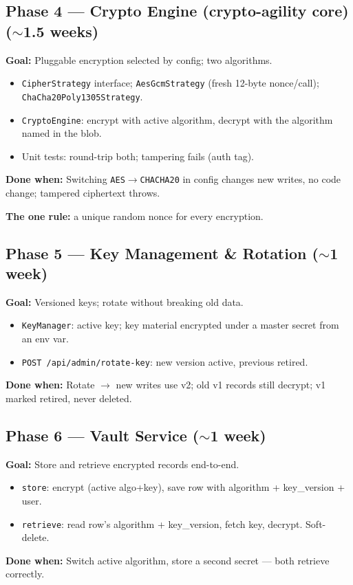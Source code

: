 \documentclass[11pt,a4paper]{article}
\newcommand{\code}[1]{\texttt{#1}}
\begin{document}
\subsection{Phase 4 — Crypto Engine (crypto-agility core) ($\sim$1.5 weeks)}
\textbf{Goal:} Pluggable encryption selected by config; two algorithms.
\begin{itemize}[leftmargin=*]
  \item \code{CipherStrategy} interface; \code{AesGcmStrategy} (fresh 12-byte nonce/call); \code{ChaCha20Poly1305Strategy}.
  \item \code{CryptoEngine}: encrypt with active algorithm, decrypt with the algorithm named in the blob.
  \item Unit tests: round-trip both; tampering fails (auth tag).
\end{itemize}
\textbf{Done when:} Switching \code{AES}$\to$\code{CHACHA20} in config changes new writes, no code change; tampered ciphertext throws.
\begin{note}\textbf{The one rule:} a unique random nonce for every encryption.\end{note}

\subsection{Phase 5 — Key Management \& Rotation ($\sim$1 week)}
\textbf{Goal:} Versioned keys; rotate without breaking old data.
\begin{itemize}[leftmargin=*]
  \item \code{KeyManager}: active key; key material encrypted under a master secret from an env var.
  \item \code{POST /api/admin/rotate-key}: new version active, previous retired.
\end{itemize}
\textbf{Done when:} Rotate $\to$ new writes use v2; old v1 records still decrypt; v1 marked retired, never deleted.

\subsection{Phase 6 — Vault Service ($\sim$1 week)}
\textbf{Goal:} Store and retrieve encrypted records end-to-end.
\begin{itemize}[leftmargin=*]
  \item \code{store}: encrypt (active algo+key), save row with algorithm + key\_version + user.
  \item \code{retrieve}: read row's algorithm + key\_version, fetch key, decrypt. Soft-delete.
\end{itemize}
\textbf{Done when:} Switch active algorithm, store a second secret — both retrieve correctly.
\end{document}
